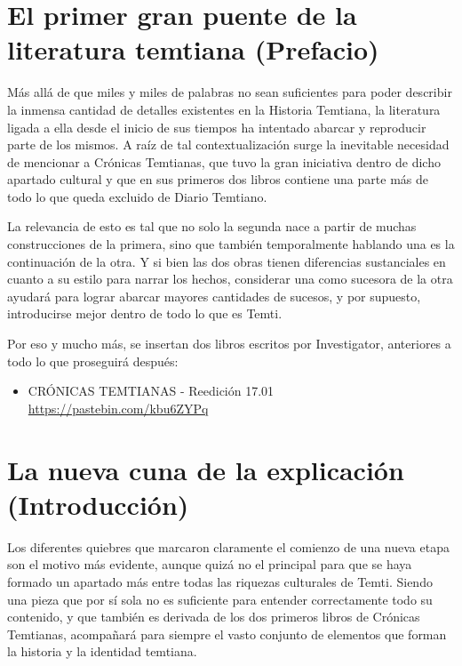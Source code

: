 \documentclass[
]{book}
\providecommand{\tightlist}{%
  \setlength{\itemsep}{0pt}\setlength{\parskip}{0pt}}
\begin{document}
\hypertarget{el-primer-gran-puente-de-la-literatura-temtiana-prefacio}{%
\chapter{El primer gran puente de la literatura temtiana (Prefacio)}\label{el-primer-gran-puente-de-la-literatura-temtiana-prefacio}}

Más allá de que miles y miles de palabras no sean suficientes para poder describir la inmensa cantidad de detalles existentes en la Historia Temtiana, la literatura ligada a ella desde el inicio de sus tiempos ha intentado abarcar y reproducir parte de los mismos. A raíz de tal contextualización surge la inevitable necesidad de mencionar a Crónicas Temtianas, que tuvo la gran iniciativa dentro de dicho apartado cultural y que en sus primeros dos libros contiene una parte más de todo lo que queda excluido de Diario Temtiano.

La relevancia de esto es tal que no solo la segunda nace a partir de muchas construcciones de la primera, sino que también temporalmente hablando una es la continuación de la otra. Y si bien las dos obras tienen diferencias sustanciales en cuanto a su estilo para narrar los hechos, considerar una como sucesora de la otra ayudará para lograr abarcar mayores cantidades de sucesos, y por supuesto, introducirse mejor dentro de todo lo que es Temti.

Por eso y mucho más, se insertan dos libros escritos por Investigator, anteriores a todo lo que proseguirá después:

\begin{itemize}
\tightlist
\item
  CRÓNICAS TEMTIANAS - Reedición 17.01 \url{https://pastebin.com/kbu6ZYPq}
\end{itemize}

\hypertarget{la-nueva-cuna-de-la-explicaciuxf3n-introducciuxf3n}{%
\chapter{La nueva cuna de la explicación (Introducción)}\label{la-nueva-cuna-de-la-explicaciuxf3n-introducciuxf3n}}

Los diferentes quiebres que marcaron claramente el comienzo de una nueva etapa son el motivo más evidente, aunque quizá no el principal para que se haya formado un apartado más entre todas las riquezas culturales de Temti. Siendo una pieza que por sí sola no es suficiente para entender correctamente todo su contenido, y que también es derivada de los dos primeros libros de Crónicas Temtianas, acompañará para siempre el vasto conjunto de elementos que forman la historia y la identidad temtiana.
\end{document}

